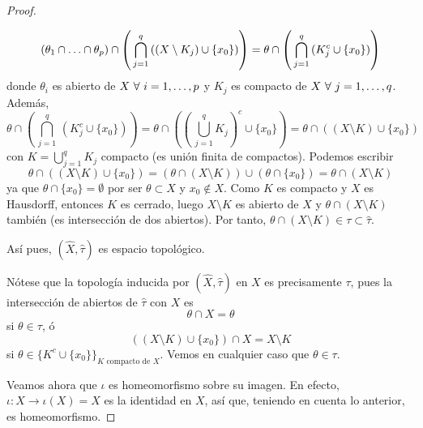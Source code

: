 \documentclass[12pt]{report}
\theoremstyle{definition}
\theoremstyle{definition}
\theoremstyle{remark}
\begin{document}
\begin{proof}
\begin{itemize}
    \[(\theta_1 \cap \mathellipsis \cap \theta_p) \cap \left( \, \bigcap_{j=1}^q \, ((X \setminus K_j) \cup \{x_0\})\right) = \theta \cap \left( \, \bigcap_{j=1}^q \, (K_j^c \cup \{x_0\})\right)\]
    donde $\theta_i$ es abierto de $X \ \forall \ i = 1,\mathellipsis,p$ y $K_j$ es compacto de $X \ \forall \ j=1,\mathellipsis,q$. Además,
    \[\theta \cap \left( \, \bigcap_{j=1}^q \, (K_j^c \cup \{x_0\})\right) = \theta \cap \left(\left( \, \bigcup_{j=1}^qK_j\right)^c \cup \{x_0\}\right) = \theta \cap ((X \setminus K) \cup \{x_0\})\]
    con $K = \bigcup_{j=1}^qK_j$ compacto (es unión finita de compactos). Podemos escribir
    \[\theta \cap ((X \setminus K) \cup \{x_0\}) = (\theta \cap (X \setminus K)) \cup (\theta \cap \{x_0\}) = \theta \cap (X \setminus K)\]
    ya que $\theta \cap \{x_0\} = \emptyset$ por ser $\theta \subset X$ y $x_0 \notin X$. Como $K$ es compacto y $X$ es Hausdorff, entonces $K$ es cerrado, luego $X \setminus K$ es abierto de $X$ y $\theta \cap (X \setminus K)$ también (es intersección de dos abiertos). Por tanto, $\theta \cap (X \setminus K) \in \tau \subset \hat{\tau}$.
\end{itemize}
Así pues, $(\hat{X},\hat{\tau})$ es espacio topológico.

\vspace{2mm}
Nótese que la topología inducida por $(\hat{X},\hat{\tau})$ en $X$ es precisamente $\tau$, pues la intersección de abiertos de $\hat{\tau}$ con $X$ es 
\[\theta \cap X = \theta\]
si $\theta \in \tau$, ó
\[((X \setminus K) \cup \{x_0\}) \cap X = X \setminus K\]
si $\theta \in \{K^c \cup \{x_0\}\}_{K \textrm{ compacto de } X}$. Vemos en cualquier caso que $\theta \in \tau$.

\vspace{2mm}
Veamos ahora que $\iota$ es homeomorfismo sobre su imagen. En efecto, $\iota \colon X \to \iota(X) = X$ es la identidad en $X$, así que, teniendo en cuenta lo anterior, es homeomorfismo.


\end{proof}
\end{document}
